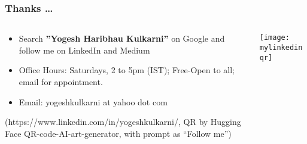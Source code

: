 \begin{frame}[fragile]\frametitle{Thanks \ldots}
\begin{columns}
    \begin{column}[T]{0.6\linewidth}
		\begin{itemize}
		\item Search {\Large \bf ''Yogesh Haribhau Kulkarni''} on Google and follow me on LinkedIn and Medium
		\item Office Hours: Saturdays, 2 to 5pm (IST); Free-Open to all; email for appointment.
		\item Email: yogeshkulkarni at yahoo dot com
		\end{itemize}
		
		{\tiny (https://www.linkedin.com/in/yogeshkulkarni/, QR by Hugging Face QR-code-AI-art-generator, with prompt as ``Follow me'')}		
    \end{column}
    \begin{column}[T]{0.4\linewidth}
		\begin{center}
		\texttt{[image: mylinkedinqr]}
		\end{center}	
    \end{column}
  \end{columns}
\end{frame}